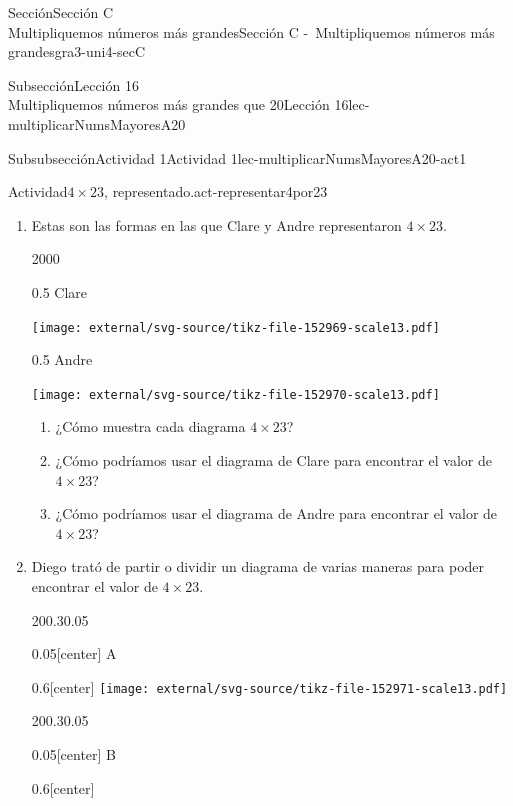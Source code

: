 \begin{sectionptx}{Sección}{{\Large Sección C\\}Multipliquemos números más grandes}{}{Sección C -~Multipliquemos números más grandes}{}{}{gra3-uni4-secC}
\begin{subsectionptx}{Subsección}{{\normalsize Lección 16\\[-0.05cm]}Multipliquemos números más grandes que 20}{}{Lección 16}{}{}{lec-multiplicarNumsMayoresA20}
%
\typeout{************************************************}
\typeout{************************************************}
%
\begin{subsubsectionptx}{Subsubsección}{Actividad 1}{}{Actividad 1}{}{}{lec-multiplicarNumsMayoresA20-act1}
\begin{activity}{Actividad}{\(4\times 23\), representado.}{act-representar4por23}%
%
\begin{enumerate}
\item{}Estas son las formas en las que Clare y Andre representaron \(4\times 23\).%
\begin{sidebyside}{2}{0}{0}{0}%
\begin{sbspanel}{0.5}%
Clare%
\par
\texttt{[image: external/svg-source/tikz-file-152969-scale13.pdf]}
\end{sbspanel}%
\begin{sbspanel}{0.5}%
Andre%
\par
\texttt{[image: external/svg-source/tikz-file-152970-scale13.pdf]}
\end{sbspanel}%
\end{sidebyside}%
%
\begin{enumerate}
\item{}¿Cómo muestra cada diagrama \(4\times 23\)?%
\item{}¿Cómo podríamos usar el diagrama de Clare para encontrar el valor de \(4\times 23\)?%
\item{}¿Cómo podríamos usar el diagrama de Andre para encontrar el valor de \(4\times 23\)?%
\end{enumerate}
\clearpage
\item{}Diego trató de partir o dividir un diagrama de varias maneras para poder encontrar el valor de \(4\times 23\).%
\begin{sidebyside}{2}{0}{0.3}{0.05}%
\begin{sbspanel}{0.05}[center]%
A%
\end{sbspanel}%
\begin{sbspanel}{0.6}[center]%
\texttt{[image: external/svg-source/tikz-file-152971-scale13.pdf]}
\end{sbspanel}%
\end{sidebyside}%
\begin{sidebyside}{2}{0}{0.3}{0.05}%
\begin{sbspanel}{0.05}[center]%
B%
\end{sbspanel}%
\begin{sbspanel}{0.6}[center]%

\end{sbspanel}
\end{sidebyside}
\end{enumerate}
\end{activity}
\end{subsubsectionptx}
\end{subsectionptx}
\end{sectionptx}

